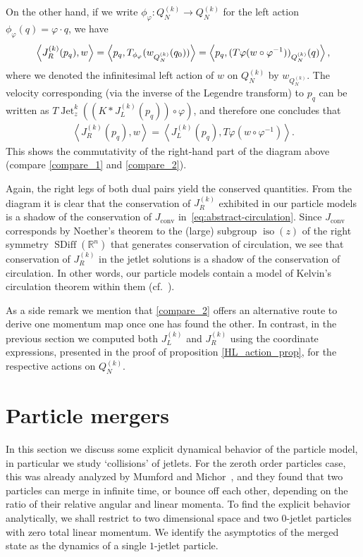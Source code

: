 \documentclass[12pt]{amsart}
\newcommand{\R}{\ensuremath{\mathbb{R}}}
\DeclareMathOperator{\SDiff}{SDiff}
\DeclareMathOperator{\Jet}{Jet}
\DeclareMathOperator{\iso}{iso}
\begin{document}
 On the other hand, if we write $\phi_\varphi: Q^{(k)}_N \to Q^{(k)}_N$ for the left action $\phi_\varphi (q) = \varphi \cdot q$, we have 
 \begin{align}
 	\left<J_R^{(k)}(p_q), w\right> = \left< p_q, T_{\phi_\varphi} (w_{Q^{(k)}_N} (q_0))   \right> =  \left<p_q, (T\varphi (w \circ \varphi^{-1}) )_{Q^{(k)}_N} (q) \right>, \notag \end{align}
 where we denoted the infinitesimal left action of $w$ on $Q^{(k)}_N$ by $w_{Q^{(k)}_N}$. The velocity corresponding (via the inverse of the Legendre transform) to $p_q$ can be written as $ T\Jet_z^k( (K * J_L^{(k)}(p_q)) \circ \varphi)$,
 and therefore one concludes that 
 \begin{align}
 	\left<J_R^{(k)}(p_q), w\right> = \left< J_L^{(k)}(p_q), T \varphi (w \circ \varphi^{-1}) \right>. \label{compare_2}
 \end{align}
 This shows the commutativity of the right-hand part of the  diagram above (compare \eqref{compare_1} and \eqref{compare_2}).
  
  Again, the right legs of both dual pairs yield the conserved quantities.
From the diagram it is clear that the conservation of $J_R^{(k)}$ exhibited in
our particle models is a shadow of the conservation of $J_\text{conv}$ in~\eqref{eq:abstract-circulation}.
Since $J_\text{conv}$ corresponds by Noether's theorem to the (large)
subgroup $\iso(z)$ of the right symmetry $\SDiff(\R^n)$ that generates
conservation of circulation, we see that conservation of $J_R^{(k)}$ in the jetlet solutions is a shadow
of the conservation of circulation.
In other words, our particle models contain a model of Kelvin's circulation theorem within them (cf.~\cite[Theorem 5.5]{JacobsRatiuDesbrun2013}).

As a side remark we mention that \eqref{compare_2} offers an alternative route to derive one momentum map once one has found the other. In contrast,  in the previous section we computed both $J_L^{(k)}$ and $J_R^{(k)}$ using the coordinate expressions, presented in the proof of proposition \ref{HL_action_prop},  for the respective actions on $Q^{(k)}_N$.


\section{Particle mergers}
\label{sec:collisions}

In this section we discuss some explicit dynamical behavior of the
particle model, in particular we study `collisions' of jetlets. For
the zeroth order particles case, this was already analyzed by Mumford
and Michor~\cite{MumfordMichor2013}, and they found that two
particles can merge in infinite time, or bounce off each other,
depending on the ratio of their relative angular and linear momenta.
To find the explicit behavior analytically, we shall restrict to two
dimensional space and two $0$-jetlet particles with zero total linear
momentum. We identify the asymptotics of the merged state as the
dynamics of a single $1$-jetlet particle.
\end{document}

